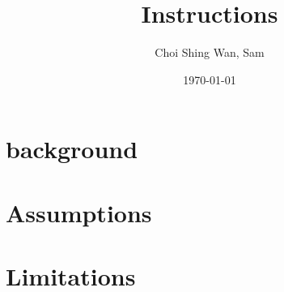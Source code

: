 \documentclass{report}
\title{Instructions}
\date{\today}
\author{Choi Shing Wan, Sam}
\begin{document}
\maketitle
\section{background}
\section{Assumptions}
\section{Limitations}
\end{document}

